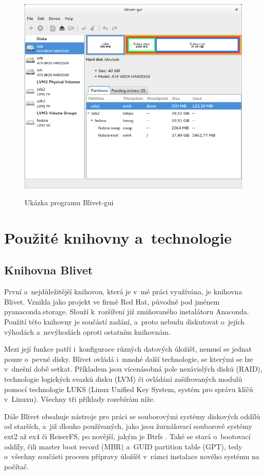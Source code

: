\documentclass[color,table,oneside,nolot,nolof]{fithesis}
\begin{document}
 \begin{figure}[h!]
	 \label{fig:blivet}
	 \caption{Ukázka programu Blivet-gui~\cite{blivet-gui}}
	 \centering
	 \includegraphics[width=.8\columnwidth]{pictures/blivet-gui-1.png}\\
 \end{figure}

\chapter{Použité knihovny a~technologie}
\section{Knihovna Blivet}
	První a~nejdůležitější knihovou, která je v~mé práci využívána, je knihovna Blivet. Vznikla jako projekt
	ve firmě Red Hat, původně pod jménem pyanaconda.storage\cite{blivet}. Slouží k~rozšíření již zmiňovaného instalátoru Anaconda. Použití této knihovny je součástí zadání, 
	a~proto nebudu diskutovat o~jejích výhodách a~nevýhodách oproti ostatním knihovnám. 

	Mezi její funkce patří i~konfigurace různých datových úložišť, nemusí se jednat pouze o~pevné disky.
	Blivet ovládá i~mnohé další technologie, se kterými se lze v~dnešní době setkat. Příkladem jsou vícenásobná pole nezávislých disků (RAID), technologie logických svazků disku (LVM) či 
	ovládání zašifrovaných modulů pomocí technologie LUKS (Linux Unified Key System, systém pro správu klíčů v~Linuxu). Všechny tři příklady rozebírám níže.

	Dále Blivet obsahuje nástroje pro práci se souborovými systémy diskových oddílů od starších, a~již dlouho používaných, jako jsou žurnálovací souborové systémy ext2 až ex4 či ReiserFS\cite{journalFS}, 
	po novější, jakým je Btrfs . Také se stará o~bootovací oddíly, čili master boot record (MBR) a~GUID partition table (GPT), tedy o~všechny součásti procesu přípravy úložíšť v~rámci instalace 
	nového systému na počítač.
\end{document}

